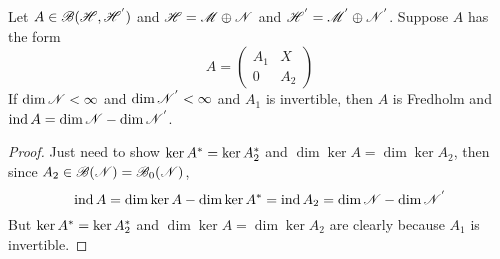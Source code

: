 \documentclass[a4paper,11pt]{report}
\begin{document}
\begin{lem}
	Let $A \in \mathscr{B}(\mathscr{H},\mathscr{H^{'}})$ and $\mathscr{H} = \mathscr{M} \oplus \mathscr{N}$ and $\mathscr{H}^{'} = \mathscr{M}^{'} \oplus \mathscr{N}^{'}$. Suppose $A$ has the form
	\begin{equation*}
		A = \left(
			\begin{array}{cc}
				A_1 & X \\
				0 & A_2
			\end{array}
		\right)
	\end{equation*}
	If $\dim{\mathscr{N}} < \infty$ and $\dim{\mathscr{N}^{'}} < \infty$ and $A_1$ is invertible, then $A$ is Fredholm and $\operatorname{ind}{A} = \dim{\mathscr{N}}-\dim{\mathscr{N}^{'}}$.
\end{lem}
\begin{proof}
	Just need to show $\ker{A^{*}} = \ker{A_2^{*}}$ and $\dim{\ker{A}} = \dim{\ker{A_2}}$, then since $A_2 \in \mathscr{B}(\mathscr{N})=\mathscr{B}_0(\mathscr{N})$, 
	\begin{equation*}
		\operatorname{ind}{A} = \dim{\ker{A}} - \dim{\ker{A^{*}}} = \operatorname{ind}{A_2} = \dim{\mathscr{N}}-\dim{\mathscr{N}^{'}}
	\end{equation*}
	But $\ker{A^{*}} = \ker{A_2^{*}}$ and $\dim{\ker{A}} = \dim{\ker{A_2}}$ are clearly because $A_1$ is invertible.
\end{proof}
\end{document}
